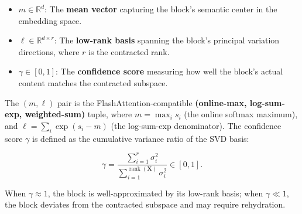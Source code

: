 \documentclass[11pt, a4paper, oneside]{article}
\theoremstyle{myplain}
\theoremstyle{mydefinition}
\theoremstyle{myremark}
\newcommand{\R}{\mathbb{R}}
\DeclareMathOperator{\rank}{rank}
\begin{document}
\begin{itemize}
    \item $m \in \R^d$: The \textbf{mean vector} capturing the block's semantic center in the embedding space.
    \item $\ell \in \R^{d \times r}$: The \textbf{low-rank basis} spanning the block's principal variation directions, where $r$ is the contracted rank.
    \item $\gamma \in [0, 1]$: The \textbf{confidence score} measuring how well the block's actual content matches the contracted subspace.
\end{itemize}

The $(m, \ell)$ pair is the FlashAttention-compatible \textbf{(online-max, log-sum-exp, weighted-sum)} tuple, where $m = \max_i s_i$ (the online softmax maximum), and $\ell = \sum_i \exp(s_i - m)$ (the log-sum-exp denominator). The confidence score $\gamma$ is defined as the cumulative variance ratio of the SVD basis:

\begin{equation}
    \gamma = \frac{\sum_{i=1}^{r} \sigma_i^2}{\sum_{i=1}^{\rank(\mathbf{X})} \sigma_i^2} \in [0, 1].
    \label{eq:gamma_def}
\end{equation}

When $\gamma \approx 1$, the block is well-approximated by its low-rank basis; when $\gamma \ll 1$, the block deviates from the contracted subspace and may require rehydration.

\begin{figure}[t]
    \centering
    \label{fig:contract_model}
\end{figure}
\end{document}
